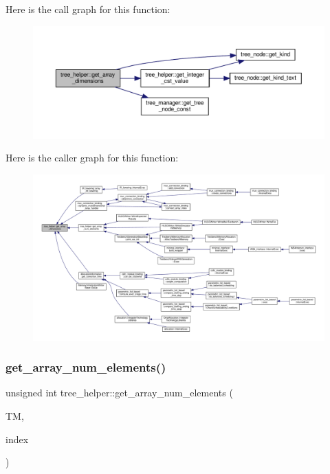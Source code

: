 Here is the call graph for this function\+:
\nopagebreak
\begin{figure}[H]
\begin{center}
\leavevmode
\includegraphics[width=350pt]{d7/d99/classtree__helper_af8f0e7df9b2a26a0610eeb6b4f7d23e2_cgraph}
\end{center}
\end{figure}
Here is the caller graph for this function\+:
\nopagebreak
\begin{figure}[H]
\begin{center}
\leavevmode
\includegraphics[width=350pt]{d7/d99/classtree__helper_af8f0e7df9b2a26a0610eeb6b4f7d23e2_icgraph}
\end{center}
\end{figure}
\mbox{\label{classtree__helper_a81cf8c1b36aa54a55aa4d543425531ab}} 
\subsubsection{\texorpdfstring{get\+\_\+array\+\_\+num\+\_\+elements()}{get\_array\_num\_elements()}}
{\footnotesize\ttfamily unsigned int tree\+\_\+helper\+::get\+\_\+array\+\_\+num\+\_\+elements (\begin{DoxyParamCaption}\item[{const \hyperlink{tree__manager_8hpp_a792e3f1f892d7d997a8d8a4a12e39346}{tree\+\_\+manager\+Const\+Ref} \&}]{TM,  }\item[{const unsigned int}]{index }\end{DoxyParamCaption})\hspace{0.3cm}{\ttfamily [static]}}



